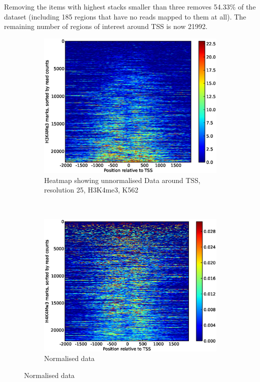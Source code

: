 \documentclass[10pt,a4paper]{article}
\begin{document}
Removing the items with highest stacks smaller than three removes 54.33\% of the dataset (including 185 regions that have no reads mapped to them at all). The remaining number of regions of interest around TSS is now 21992.

\begin{figure}
\centering
\begin{subfigure}{0.45\textwidth}
	\includegraphics[width=\textwidth]{images/heatmap-k562-h3k4me3-res25-full-peak-data.eps}
	\caption{Heatmap showing unnormalised Data around TSS, resolution 25, H3K4me3, K562}
	\label{fig:heatmap-k562-h3k4me3-unnormalised}
\end{subfigure}
~
\begin{subfigure}{0.45\textwidth}
	\includegraphics[width=\textwidth]{images/heatmap-k562-h3k4me3-res25-full-normalised-peak-data.eps}
    \caption{Normalised data}
    \label{fig:heatmap-k562-h3k4me3-normalised}
\end{subfigure}
\end{figure}
\end{document}
